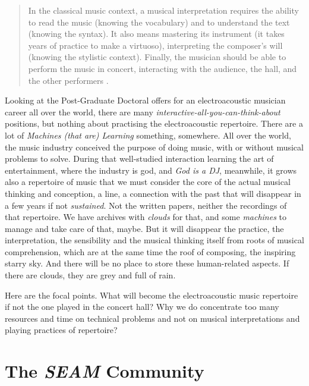 \documentclass[twoside,a4paper]{article}
\begin{document}
\begin{quote}
In the classical music context, a musical interpretation requires the ability to
read the music (knowing the vocabulary) and to understand the text (knowing the
syntax). It also means mastering its instrument (it takes years of practice to
make a virtuoso), interpreting the composer's will (knowing the stylistic context).
Finally, the musician should be able to perform the music in concert, interacting
with the audience, the hall, and the other performers \cite{lem16}.
\end{quote}

Looking at the Post-Graduate Doctoral offers for an electroacoustic musician
career all over the world, there are many \emph{interactive-all-you-can-think-about}
positions, but nothing about practising the electroacoustic repertoire. There are
a lot of \emph{Machines (that are) Learning} something, somewhere. All over the
world, the music industry conceived the purpose of doing music, with or without
musical problems to solve. During that well-studied interaction learning the art
of entertainment, where the industry is god, and \emph{God is a DJ}, meanwhile,
it grows also a repertoire of music that we must consider the core of the actual
musical thinking and conception, a line, a connection with the past that will
disappear in a few years if not \emph{sustained}. Not the written papers, neither
the recordings of that repertoire. We have archives with \emph{clouds} for that,
and some \emph{machines} to manage and take care of that, maybe. But it will
disappear the practice, the interpretation, the sensibility and the musical
thinking itself from roots of musical comprehension, which are at the same time
the roof of composing, the inspiring starry sky. And there will be no place to
store these human-related aspects. If there are clouds, they are grey and full
of rain.

Here are the focal points. What will become the electroacoustic music repertoire
if not the one played in the concert hall? Why we do concentrate too many
resources and time on technical problems and not on musical interpretations and
playing practices of repertoire?


\section{The \emph{SEAM} Community}
\label{sec:seam}
\end{document}
